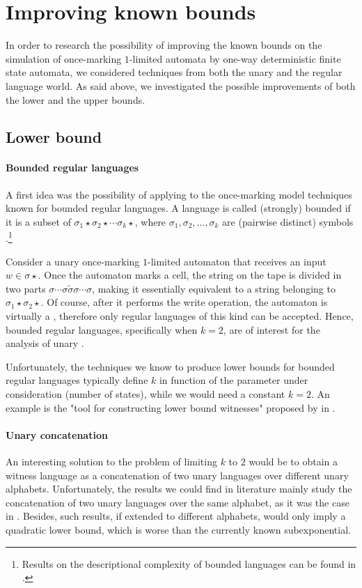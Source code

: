 \section{Improving known bounds}\label{sec:oncemarking-ideas}
In order to research the possibility of improving the known bounds on the simulation of once-marking $1$-limited automata by one-way deterministic finite state automata, we considered techniques from both the unary and the regular language world.
As said above, we investigated the possible improvements of both the lower and the upper bounds.


\subsection{Lower bound}

\paragraph{Bounded regular languages} A first idea was the possibility of applying to the once-marking model techniques known for bounded regular languages.
A language is called (strongly) bounded if it is a subset of $\sigma_1\star\sigma_2\star\cdots\sigma_k\star$, where $\sigma_1,\sigma_2,\dots,\sigma_k$ are (pairwise distinct) symbols \cite{GinSpa66}.\footnote{%
	Results on the descriptional complexity of bounded languages can be found in \cite{Gin66,MalPig13,IbaRav16,HerKut+17}.}

Consider a unary once-marking $1$-limited automaton that receives an input $w\in\sigma\star$.
Once the automaton marks a cell, the string on the tape is divided in two parts $\sigma\cdots\sigma \tilde\sigma \sigma\cdots\sigma$, making it essentially equivalent to a string belonging to $\sigma_1\star\sigma_2\star$.
Of course, after it performs the write operation, the automaton is virtually a \TNFA, therefore only regular languages of this kind can be accepted.
Hence, bounded regular languages, specifically when $k=2$, are of interest for the analysis of unary \OMOLA.

Unfortunately, the techniques we know to produce lower bounds for bounded regular languages typically define $k$ in function of the parameter under consideration (number of states), while we would need a constant $k=2$.
An example is the "tool for constructing lower bound witnesses" proposed by \citeauthor{HerKut+17} in \cite{HerKut+17}.

\paragraph{Unary concatenation} An interesting solution to the problem of limiting $k$ to $2$ would be to obtain a witness language as a concatenation of two unary languages over different unary alphabets.
Unfortunately, the results we could find in literature mainly study the concatenation of two unary languages over the same alphabet, as it was the case in \cite{YuZhu+94,PigSha02}.
Besides, such results, if extended to different alphabets, would only imply a quadratic lower bound, which is worse than the currently known subexponential.

